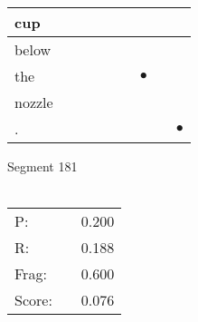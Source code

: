 \documentclass[landscape]{article}
\newcommand{\ssp}{\hspace{2pt}}
\newcommand{\mex}{\cellcolor{g}$\bullet$}
\begin{document}
\begin{tabular}{|l|p{10pt}|p{10pt}|p{10pt}|p{10pt}|p{10pt}|p{10pt}|p{10pt}|p{10pt}|}
\hline
\ssp cup \ssp&\hspace{2pt}&\hspace{2pt}&\hspace{2pt}&\hspace{2pt}&\hspace{2pt}&\hspace{2pt}&\hspace{2pt}&\hspace{2pt}\\
\hline
\ssp below \ssp&\hspace{2pt}&\hspace{2pt}&\hspace{2pt}&\hspace{2pt}&\hspace{2pt}&\hspace{2pt}&\hspace{2pt}&\hspace{2pt}\\
\hline
\ssp \cellcolor{ref5}the \ssp&\hspace{2pt}&\hspace{2pt}&\hspace{2pt}&\hspace{2pt}&\hspace{2pt}&\hspace{2pt}\mex&\hspace{2pt}&\hspace{2pt}\\
\hline
\ssp nozzle \ssp&\hspace{2pt}&\hspace{2pt}&\hspace{2pt}&\hspace{2pt}&\hspace{2pt}&\hspace{2pt}&\hspace{2pt}&\hspace{2pt}\\
\hline
\ssp \cellcolor{ref7}. \ssp&\hspace{2pt}&\hspace{2pt}&\hspace{2pt}&\hspace{2pt}&\hspace{2pt}&\hspace{2pt}&\hspace{2pt}&\hspace{2pt}\mex\\
\hline
\end{tabular}

\vspace{6pt}
\noindent Segment 181\\\\
\noindent\begin{tabular}{lm{12pt}r}
\hline
P:&&0.200\\
R:&&0.188\\
Frag:&&0.600\\
Score:&&0.076\\
\end{tabular}
\end{document}

